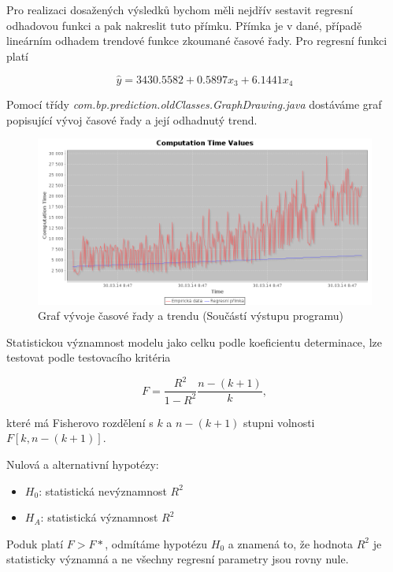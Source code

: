 \documentclass[a4paper,12pt,twoside]{scrreprt}
\begin{document}
Pro realizaci dosažených výsledků bychom měli nejdřív sestavit regresní odhadovou funkci a pak nakreslit tuto přímku. Přímka je v dané, případě lineárním odhadem trendové funkce zkoumané časové řady. Pro regresní funkci platí

\begin{equation}
\hat{y} = 3430.5582 + 0.5897x_3 + 6.1441x_4
\end{equation}

Pomocí třídy \textit{com.bp.prediction.oldClasses.GraphDrawing.java} dostáváme graf popisující vývoj časové řady a její odhadnutý trend.

\begin{figure}[h]
  \centering
  \includegraphics[width=15cm]{pictures/regresniFunkce.png}
  \caption{Graf vývoje časové řady a trendu \newline(Součástí výstupu programu)}
  \label{fig:regrese}
\end{figure}

Statistickou významnost modelu jako celku podle koeficientu determinace, lze testovat podle testovacího kritéria 

\begin{equation}
F = \frac{R^2}{1 - R^2}\frac{n-(k+1)}{k},
\end{equation}

které má Fisherovo rozdělení s $k$ a $n-(k+1)$ stupni volnosti $F[k, n-(k+1)]$. 

\newpage
Nulová a alternativní hypotézy:

\begin{itemize}
\item $H_0$: statistická nevýznamnost $R^2$
\item $H_A$: statistická významnost $R^2$
\end{itemize} 

Poduk platí $F > F*$, odmítáme hypotézu $H_0$ a znamená to, že hodnota $R^2$ je statisticky významná a ne všechny regresní parametry jsou rovny nule. 
\end{document}
